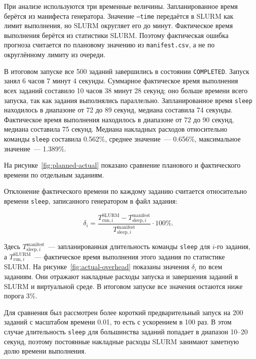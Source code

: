 При анализе используются три временные величины. Запланированное время берётся из манифеста генератора. Значение \texttt{--time} передаётся в SLURM как лимит выполнения, но SLURM округляет его до минут. Фактическое время выполнения берётся из статистики SLURM. Поэтому фактическая ошибка прогноза считается по плановому значению из \texttt{manifest.csv}, а не по округлённому лимиту из очереди.

В итоговом запуске все 500 заданий завершились в состоянии \texttt{COMPLETED}. Запуск занял 6 часов 7 минут 4 секунды. Суммарное фактическое время выполнения всех заданий составило 10 часов 38 минут 28 секунд; оно больше времени всего запуска, так как задания выполнялись параллельно. Запланированное время \texttt{sleep} находилось в диапазоне от 72 до 89 секунд, медиана составила 74 секунды. Фактическое время выполнения находилось в диапазоне от 72 до 90 секунд, медиана составила 75 секунд. Медиана накладных расходов относительно команды \texttt{sleep} составила 0.562\%, среднее значение~--- 0.656\%, максимальное значение~--- 1.389\%.

На рисунке~\ref{fig:planned-actual} показано сравнение планового и фактического времени по отдельным заданиям.


Отклонение фактического времени по каждому заданию считается относительно времени \texttt{sleep}, записанного генератором в файл задания:

\[
    \delta_i =
    \frac{
        T_{\text{run}, i}^{\text{SLURM}} -
        T_{\text{sleep}, i}^{\text{manifest}}
    }{
        T_{\text{sleep}, i}^{\text{manifest}}
    }
    \cdot 100\%.
\]

Здесь $T_{\text{sleep}, i}^{\text{manifest}}$~--- запланированная длительность команды \texttt{sleep} для $i$-го задания, а $T_{\text{run}, i}^{\text{SLURM}}$~--- фактическое время выполнения этого задания по статистике SLURM. На рисунке~\ref{fig:actual-overhead} показаны значения $\delta_i$ по всем заданиям. Они отражают накладные расходы запуска и завершения заданий в SLURM и виртуальной среде. В итоговом запуске все значения остаются ниже порога 3\%.


Для сравнения был рассмотрен более короткий предварительный запуск на 200 заданий с масштабом времени 0.01, то есть с ускорением в 100 раз. В этом случае длительность \texttt{sleep} для большинства заданий попадает в диапазон 10--20 секунд, поэтому постоянные накладные расходы SLURM занимают заметную долю времени выполнения.

